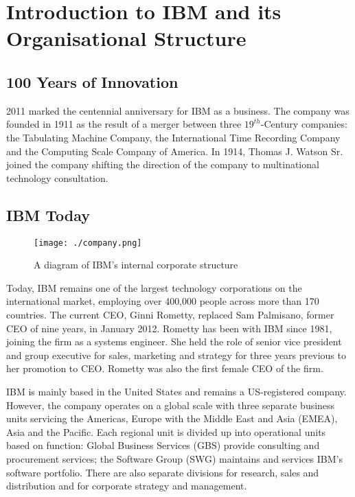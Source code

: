 \documentclass[12pt,a4paper]{article}
\begin{document}



\setlength{\parindent}{0pt}
\setlength{\parskip}{1.5ex plus 0.5ex minus 0.2ex}

\tableofcontents

\pagebreak

\section{Introduction to IBM and its Organisational Structure}

\subsection{100 Years of Innovation}
2011 marked the centennial anniversary for IBM as a business.  The company was
founded in 1911 as the result of a merger between three $19^{th}$-Century
companies: the Tabulating Machine Company, the International Time Recording
Company and the Computing Scale Company of America. In 1914, Thomas J. Watson
Sr. joined the company shifting the direction of the company to multinational
technology consultation.

\subsection{IBM Today}

\begin{figure}[!ht]
\texttt{[image: ./company.png]}
\caption{A diagram of IBM's internal corporate structure}
\end{figure}
Today, IBM remains one of the largest technology corporations on the
international market, employing over 400,000 people across more than 170
countries. The current CEO, Ginni Rometty, replaced Sam Palmisano, former CEO of
nine years, in January 2012. Rometty has been with IBM since 1981, joining the
firm as a systems engineer. She held the role of senior vice president and group
executive for sales, marketing and strategy for three years previous to her
promotion to CEO. Rometty was also the first female CEO of the firm.

IBM is mainly based in the United States and remains a US-registered company.
However, the company operates on a global scale with three separate business
units servicing the Americas, Europe with the Middle East and Asia (EMEA),   
Asia and the Pacific. Each regional unit is divided up into operational units
based on function: Global Business Services (GBS) provide consulting and
procurement services; the Software Group (SWG) maintains and services IBM’s
software portfolio. There are also separate divisions for research, sales and
distribution and for corporate strategy and management.
\end{document}
